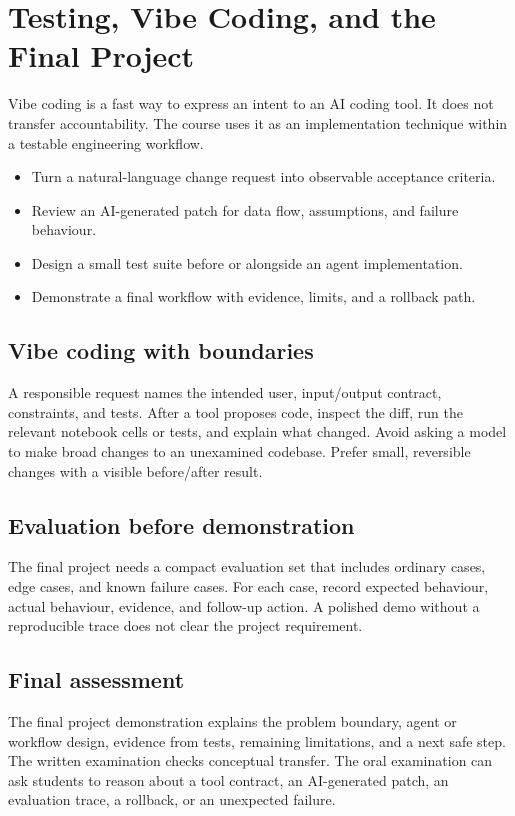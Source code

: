 \chapter{Testing, Vibe Coding, and the Final Project}\label{chap:testing}
 Vibe coding is a fast way to express an intent to an AI coding tool. It does not transfer accountability. The course uses it as an implementation technique within a testable engineering workflow.

\begin{learningbox}
\begin{itemize}
  \item Turn a natural-language change request into observable acceptance criteria.
  \item Review an AI-generated patch for data flow, assumptions, and failure behaviour.
  \item Design a small test suite before or alongside an agent implementation.
  \item Demonstrate a final workflow with evidence, limits, and a rollback path.
\end{itemize}
\end{learningbox}

\section{Vibe coding with boundaries}
A responsible request names the intended user, input/output contract, constraints, and tests. After a tool proposes code, inspect the diff, run the relevant notebook cells or tests, and explain what changed. Avoid asking a model to make broad changes to an unexamined codebase. Prefer small, reversible changes with a visible before/after result.

\section{Evaluation before demonstration}
The final project needs a compact evaluation set that includes ordinary cases, edge cases, and known failure cases. For each case, record expected behaviour, actual behaviour, evidence, and follow-up action. A polished demo without a reproducible trace does not clear the project requirement.

\section{Final assessment}
The final project demonstration explains the problem boundary, agent or workflow design, evidence from tests, remaining limitations, and a next safe step. The written examination checks conceptual transfer. The oral examination can ask students to reason about a tool contract, an AI-generated patch, an evaluation trace, a rollback, or an unexpected failure.

